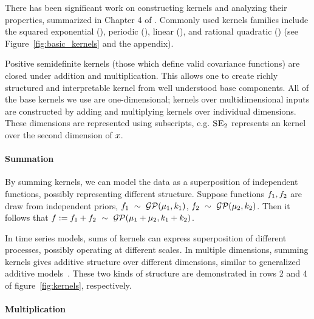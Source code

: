 \documentclass[twoside]{article}
\renewcommand{\fTBD}[1]{}
\begin{document}
There has been significant work on constructing \gp{} kernels and analyzing their properties, summarized in Chapter 4 of \cite{rasmussen38gaussian}. 
%
Commonly used kernels families include the squared exponential (\kSE), periodic (\kPer), linear (\kLin), and rational quadratic (\kRQ) (see Figure~\ref{fig:basic_kernels} and the appendix).


Positive semidefinite kernels (\ie those which define valid covariance functions) are closed under addition and multiplication.
This allows one to create richly structured and interpretable kernel from well understood base components.
All of the base kernels we use are one-dimensional; kernels over multidimensional inputs are constructed by adding and multiplying kernels over individual dimensions.
These dimensions are represented using subscripts, e.g. $\textsc{SE}_2$ represents an \kSE{} kernel over the second dimension of $x$.
%


\paragraph{Summation}

By summing kernels, we can model the data as a superposition of independent functions, possibly representing different structure.
Suppose functions ${f_1, f_2}$ are draw from independent \gp{} priors, ${f_1 \ \sim\  \mathcal{GP}(\mu_1, k_1)}$, ${f_2 \ \sim\  \mathcal{GP}(\mu_2, k_2)}$.
Then it follows that ${f := f_1 + f_2 \ \sim\  \mathcal{GP}(\mu_1 + \mu_2, k_1 + k_2)}$.

In time series models, sums of kernels can express superposition of different processes, possibly operating at different scales.
In multiple dimensions, summing kernels gives additive structure over different dimensions, similar to generalized additive models~\citep{hastie1990generalized}.
These two kinds of structure are demonstrated in rows 2 and 4 of figure~\ref{fig:kernels}, respectively.


\paragraph{Multiplication}
\end{document}
